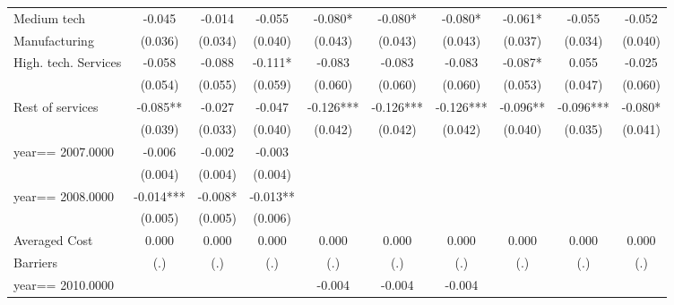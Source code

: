 \begin{table}[htbp]
\begin{tabular}{l*{9}{c}}
Medium tech         &      -0.045   &      -0.014   &      -0.055   &      -0.080*  &      -0.080*  &      -0.080*  &      -0.061*  &      -0.055   &      -0.052   \\
Manufacturing       &     (0.036)   &     (0.034)   &     (0.040)   &     (0.043)   &     (0.043)   &     (0.043)   &     (0.037)   &     (0.034)   &     (0.040)   \\
High. tech. Services&      -0.058   &      -0.088   &      -0.111*  &      -0.083   &      -0.083   &      -0.083   &      -0.087*  &       0.055   &      -0.025   \\
                    &     (0.054)   &     (0.055)   &     (0.059)   &     (0.060)   &     (0.060)   &     (0.060)   &     (0.053)   &     (0.047)   &     (0.060)   \\
Rest of services    &      -0.085** &      -0.027   &      -0.047   &      -0.126***&      -0.126***&      -0.126***&      -0.096** &      -0.096***&      -0.080*  \\
                    &     (0.039)   &     (0.033)   &     (0.040)   &     (0.042)   &     (0.042)   &     (0.042)   &     (0.040)   &     (0.035)   &     (0.041)   \\
year==  2007.0000   &      -0.006   &      -0.002   &      -0.003   &               &               &               &               &               &               \\
                    &     (0.004)   &     (0.004)   &     (0.004)   &               &               &               &               &               &               \\
year==  2008.0000   &      -0.014***&      -0.008*  &      -0.013** &               &               &               &               &               &               \\
                    &     (0.005)   &     (0.005)   &     (0.006)   &               &               &               &               &               &               \\
Averaged Cost       &       0.000   &       0.000   &       0.000   &       0.000   &       0.000   &       0.000   &       0.000   &       0.000   &       0.000   \\
Barriers            &         (.)   &         (.)   &         (.)   &         (.)   &         (.)   &         (.)   &         (.)   &         (.)   &         (.)   \\
year==  2010.0000   &               &               &               &      -0.004   &      -0.004   &      -0.004   &               &               &               \\

\end{tabular}
\end{table}
